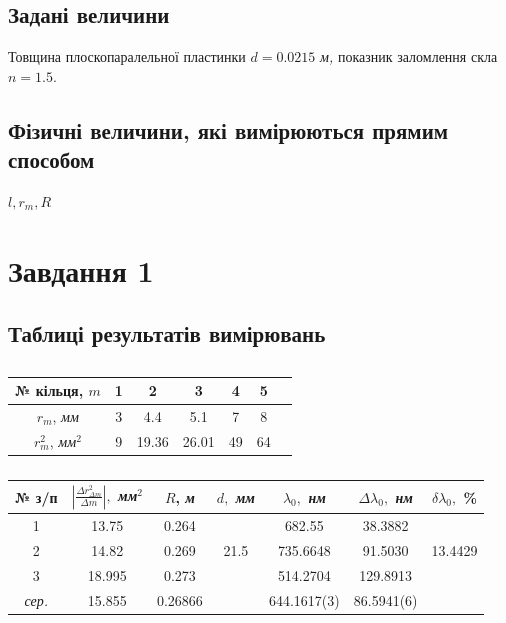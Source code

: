 \documentclass[12pt]{extreport}
\begin{document}
\subsection*{Задані величини}
Товщина плоскопаралельної пластинки $d=0.0215$ \textit{м,}
показник заломлення скла $n=1.5$.

\subsection*{Фізичні величини, які вимірюються прямим способом}

$l, r_m, R$

\section*{Завдання 1}
\subsection*{{Таблиці результатів вимірювань}}

\renewcommand{\arraystretch}{1.3}
\begin{table}[h]
\caption{}
\centering
\begin{tabular}{|c| c| c| c| c| c| c|}
	\hline
	№ кільця, $m$ & 1 & 2 & 3 & 4 & 5\\
	\hline
	$r_m$, \textit{мм} & 3 & 4.4 & 5.1 & 7 & 8 \\
	\hline
	$r_m^2$, \textit{мм}$^2$ & 9 & 19.36 & 26.01 & 49 & 64 \\
	\hline
\end{tabular}
\end{table}
\begin{table}[h]
\caption{}
\centering
\begin{tabular}{|c| c| c| c| c| c| c|}
	\hline
	№ з/п & $\left|\frac{\Delta r_{\Delta m}^2}{\Delta m}\right|,$
	\textit{мм}$^2$ & $R$, \textit{м} & $d,$ \textit{мм} &
	$\lambda_0,$ \textit{нм} & $\Delta\lambda_0,$ \textit{нм} &
	$\delta\lambda_0,$ \% \\
	\hline
	1 & 13.75 & 0.264 & & 682.55 & 38.3882 & \\
	\cline{1-3} \cline{5-6}
	2 & 14.82 & 0.269 & 21.5 & 735.6648 & 91.5030 & 13.4429\\
	\cline{1-3} \cline{5-6}
	3 & 18.995 & 0.273 & & 514.2704 & 129.8913 & \\
	\cline{1-3} \cline{5-6}
	\textit{сер.} & 15.855 & 0.26866 & & 644.1617(3) & 86.5941(6) & \\
	\hline
\end{tabular}
\end{table}
\end{document}
